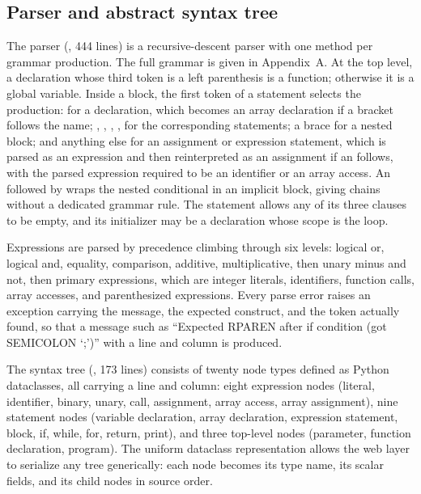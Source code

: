 \subsection{Parser and abstract syntax tree}

The parser (, 444 lines) is a recursive-descent parser with one method per grammar production. The full grammar is given in Appendix~A. At the top level, a declaration whose third token is a left parenthesis is a function; otherwise it is a global variable. Inside a block, the first token of a statement selects the production:  for a declaration, which becomes an array declaration if a bracket follows the name; , , , ,  for the corresponding statements; a brace for a nested block; and anything else for an assignment or expression statement, which is parsed as an expression and then reinterpreted as an assignment if an \code{=} follows, with the parsed expression required to be an identifier or an array access. An  followed by  wraps the nested conditional in an implicit block, giving  chains without a dedicated grammar rule. The  statement allows any of its three clauses to be empty, and its initializer may be a declaration whose scope is the loop.

Expressions are parsed by precedence climbing through six levels: logical or, logical and, equality, comparison, additive, multiplicative, then unary minus and not, then primary expressions, which are integer literals, identifiers, function calls, array accesses, and parenthesized expressions. Every parse error raises an exception carrying the message, the expected construct, and the token actually found, so that a message such as ``Expected RPAREN after if condition (got SEMICOLON `;')'' with a line and column is produced.

The syntax tree (, 173 lines) consists of twenty node types defined as Python dataclasses, all carrying a line and column: eight expression nodes (literal, identifier, binary, unary, call, assignment, array access, array assignment), nine statement nodes (variable declaration, array declaration, expression statement, block, if, while, for, return, print), and three top-level nodes (parameter, function declaration, program). The uniform dataclass representation allows the web layer to serialize any tree generically: each node becomes its type name, its scalar fields, and its child nodes in source order.

